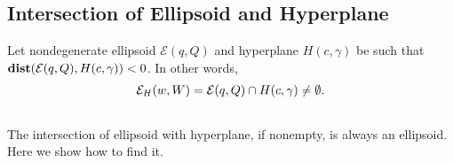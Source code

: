 \documentclass[letterpaper,10pt,english]{sphinxmanual}
\begin{document}
\subsection{Intersection of Ellipsoid and Hyperplane}
\label{main_source:intersection-of-ellipsoid-and-hyperplane}
Let nondegenerate ellipsoid ${\mathcal E}(q,Q)$ and hyperplane
$H(c,\gamma)$ be such that
${\bf dist}({\mathcal E}(q,Q),H(c,\gamma))<0$. In other words,
\begin{gather}
\begin{split}{\mathcal E}_H(w,W) = {\mathcal E}(q,Q)\cap H(c,\gamma) \neq \emptyset .\end{split}\notag\\\begin{split}\end{split}\notag
\end{gather}
The intersection of ellipsoid with hyperplane, if nonempty, is always
an ellipsoid. Here we show how to find it.
\end{document}
